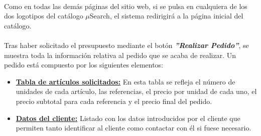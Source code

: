 \paragraph{}Como en todas las demás páginas del sitio web, si se pulsa en cualquiera de los dos logotipos del catálogo $\mu$Search, el sistema redirigirá a la página inicial del catálogo.

\paragraph{}Tras haber solicitado el presupuesto mediante el botón \textit{\textbf{''Realizar Pedido''}}, se muestra toda la información relativa al pedido
que se acaba de realizar. Un pedido está compuesto por los siguientes elementos:

\begin{itemize}
	\item \underline{\textbf{Tabla de artículos solicitados:}} En esta tabla se refleja el número de unidades de cada artículo, las referencias, el precio por unidad de cada uno, el precio subtotal para cada referencia y el precio final del pedido.
	
	\item \underline{\textbf{Datos del cliente:}} Listado con los datos introducidos por el cliente que permiten tanto identificar al cliente como contactar con él si fuese necesario.
\end{itemize}